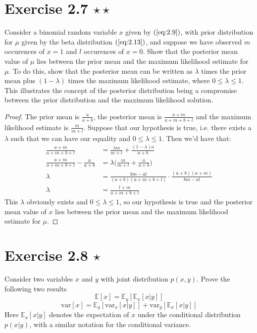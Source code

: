 \section*{Exercise 2.7 $\star \star$}
Consider a binomial random variable $x$ given by $(\ref{eq:2.9})$, with
prior distribution for $\mu$ given by the beta distribution $(\ref{eq:2.13})$,
and suppose we have observed $m$ occurences of $x=1$ and $l$ occurences 
of $x=0$. Show that the posterior mean value of $\mu$ lies between the prior
mean and the maximum likelihood estimate for $\mu$. To do this,
show that the posterior mean can be written as $\lambda$ times the prior
mean plus $(1 - \lambda)$ times the maximum likelihood estimate, 
where  $0 \leq \lambda \leq 1$. This illustrates the concept of
the posterior distribution being a compromise between the prior
distribution and the maximum likelihood solution.

\begin{proof}
    The prior mean is $\displaystyle \frac{a}{a + b}$, the posterior mean is 
    $\displaystyle \frac{a + m}{a + m + b + l}$ and the maximum likelihood 
    estimate is $\displaystyle \frac{m}{m + l}$. Suppose that our hypothesis
    is true, i.e. there exists a $\lambda$ such that we can have our equality
    and $0 \leq \lambda \leq 1$. Then we'd have that:
    \begin{align*}
        \frac{a + m}{a + m + b + l} &= \frac{\lambda m}{m + l} + \frac{(1 - \lambda)a}{a + b} \\
        \frac{a + m}{a + m + b + l} - \frac{a}{a + b} &= \lambda\bigg(\frac{m}{m + l} + \frac{a}{a + b}\bigg) \\
        \lambda &= \frac{bm - al}{(a + b)(a + m + b + l)} \cdot \frac{(a + b)(a + m)}{bm - al} \\
        \lambda &= \frac{l + m}{a + m + b + l}
    \end{align*}
    This $\lambda$ obviously exists and $0 \leq \lambda \leq 1$, so our hypothesis is
    true and the posterior mean value of $x$ lies between the prior mean
    and the maximum likelihood estimate for $\mu$.
\end{proof}

\section*{Exercise 2.8 $\star$}
Consider two variables $x$ and $y$ with joint distribution $p(x, y)$.
Prove the following two results
\begin{equation*}
    \mathbb{E}[x] = \mathbb{E}_y[\mathbb{E}_x[x | y]]
    \tag{2.270}\label{eq:2.270}
\end{equation*}
\vspace{-1em}
\begin{equation*}
    \text{var}[x] = \mathbb{E}_y[\text{var}_x[x | y]] + \text{var}_y[\mathbb{E}_x[x|y]]
    \tag{2.271}\label{eq:2.271}
\end{equation*}
Here $\mathbb{E}_x[x | y]$ denotes the expectation of $x$ under the conditional
distribution $p(x | y)$, with a similar notation for the conditional
variance.

